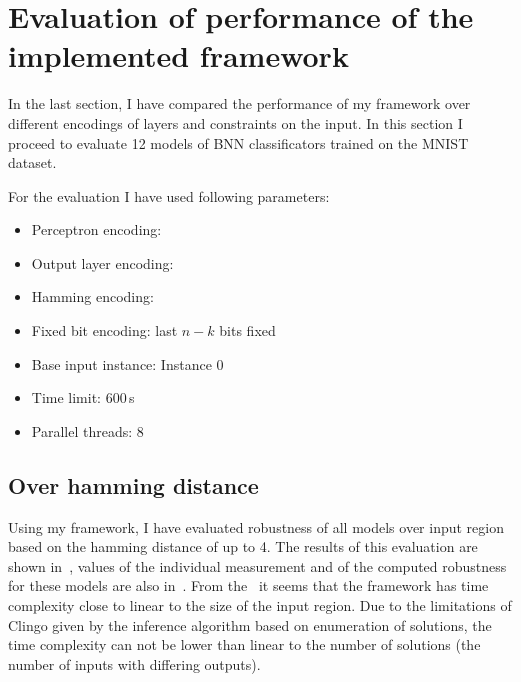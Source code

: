 \section{Evaluation of performance of the implemented framework}

In the last section, I have compared the performance of my framework
over different encodings of layers and constraints on the input.
In this section I proceed to evaluate 12 models of BNN classificators
trained on the MNIST dataset.

For the evaluation I have used following parameters:
\begin{itemize}
    \setlength{\itemsep}{0pt}
    \item Perceptron encoding: 
    \item Output layer encoding: 
    \item Hamming encoding: 
    \item Fixed bit encoding: last $n-k$ bits fixed
    \item Base input instance: Instance 0
    \item Time limit: 600\,s
    \item Parallel threads: 8
\end{itemize}

\newcommand\modelsArch{%
    1_blk_100_100_10/M1,%
    1_blk_100_50_10/M2,%
    1_blk_400_100_10/M3,%
    1_blk_64_10_10/M4,%
    1_blk_784_100_10/M5,%
    2_blk_100_100_50_10/M6,%
    2_blk_100_50_20_10/M7,%
    2_blk_16_25_20_10/M8,%
    2_blk_36_15_10_10/M9,%
    3_blk_16_64_32_20_10/M10,%
    3_blk_25_25_25_20_10/M11,%
    4_blk_784_50_50_50_50_10/M12,%
}

\newcommand\fixedLen{0_/0,4_/4,8_/8,12/12,16/16,20/20,24/24}

\makeatletter
\newcommand{\strequal}[2]{\pdf@strcmp{#1}{#2}==0}
\makeatother

\subsection{Over hamming distance}

Using my framework, I have evaluated robustness of all models over input region
based on the hamming distance of up to 4. The results of this evaluation
are shown in~, values of the individual measurement
and of the computed robustness for these models are also in~.
From the~ it seems that the framework has time complexity
close to linear to the size of the input region. Due to the limitations of Clingo
given by the inference algorithm based on enumeration of solutions,
the time complexity can not be lower than linear to the number of solutions
(the number of inputs with differing outputs).

